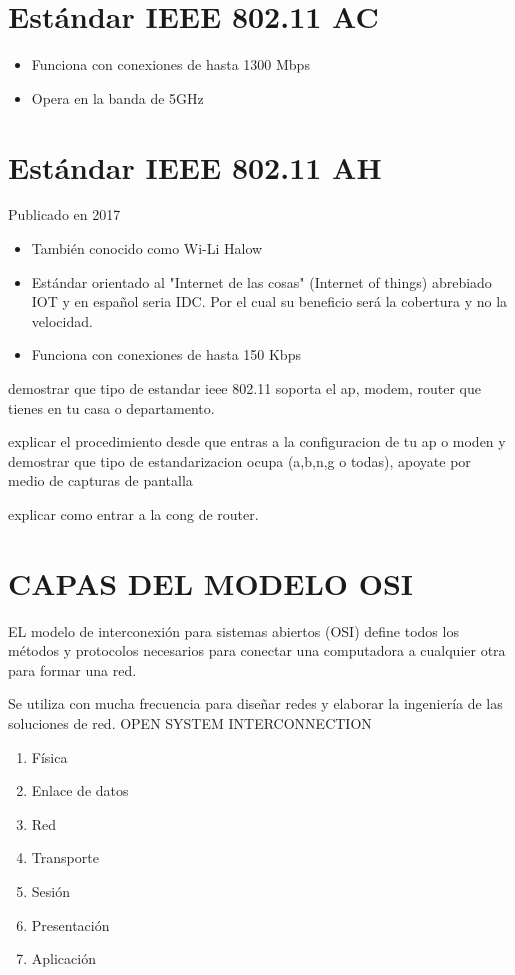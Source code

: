 \documentclass[letterpaper,12pt]{article}
\begin{document}
\begin{sloppypar}
\section{Estándar IEEE 802.11 AC}
\begin{itemize}
    \item Funciona con conexiones de hasta 1300 Mbps 
    \item Opera en la banda de 5GHz
\end{itemize}
\section{Estándar IEEE 802.11 AH}
Publicado en 2017 
\begin{itemize}
    \item También conocido como Wi-Li Halow 
    \item Estándar orientado al "Internet de las cosas" (Internet of things) abrebiado IOT y en español seria IDC. Por el cual su beneficio será la cobertura y no la velocidad.
    \item Funciona con conexiones de hasta 150 Kbps
\end{itemize}

demostrar que tipo de estandar ieee 802.11 soporta el ap, modem, router que tienes en tu casa o departamento.

explicar el procedimiento desde que entras a la configuracion de tu ap o moden y demostrar que tipo de estandarizacion ocupa (a,b,n,g o todas), apoyate por medio de capturas de pantalla

explicar como entrar a la cong de router. 

\section{CAPAS DEL MODELO OSI} 
EL modelo de interconexión para sistemas abiertos (OSI) define todos los métodos y protocolos necesarios para conectar una computadora a cualquier otra para formar una red.

Se utiliza con mucha frecuencia para diseñar redes y elaborar la ingeniería de las soluciones de red. OPEN SYSTEM INTERCONNECTION

\begin{enumerate}
    \item Física 
    \item Enlace de datos 
    \item Red 
    \item Transporte 
    \item Sesión 
    \item Presentación
    \item Aplicación
\end{enumerate}


\end{sloppypar}
\end{document}
